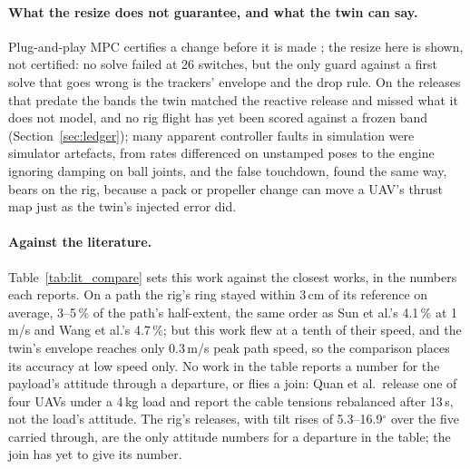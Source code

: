 \paragraph{What the resize does not guarantee, and what the twin can say.} Plug-and-play MPC certifies a change before
it is made \cite{riverso2013plug, zeilinger2013plug}; the resize here is shown, not certified: no solve failed at 26
switches, but the only guard against a first solve that goes wrong is the trackers' envelope and the drop rule. On the
releases that predate the bands the twin matched the reactive release and missed what it does not model, and no rig
flight has yet been scored against a frozen band (Section~\ref{sec:ledger}); many apparent
controller faults in simulation were simulator artefacts, from rates differenced on unstamped poses to the engine
ignoring damping on ball joints, and the false touchdown, found the same way, bears on the rig, because a pack or
propeller change can move a UAV's thrust map just as the twin's injected error did.

\paragraph{Against the literature.} Table~\ref{tab:lit_compare} sets this work against the closest works, in the
numbers each reports. On a path the rig's ring stayed within 3\,cm of its reference on average, 3--5\,\% of the
path's half-extent, the same order as Sun et al.'s 4.1\,\% at 1\,m/s and Wang et al.'s 4.7\,\%; but this work flew at
a tenth of their speed, and the twin's
envelope reaches only 0.3\,m/s peak path speed, so the comparison places its accuracy at low
speed only. No work in the table reports a number for the payload's attitude through a departure, or flies a join:
Quan et al.\ release one of four UAVs under a 4\,kg load and report the cable tensions rebalanced after 13\,s, not the
load's attitude. The rig's releases, with tilt rises of 5.3--16.9$^\circ$ over the five carried through, are the only
attitude numbers for a departure in the table; the join has yet to give its number.

